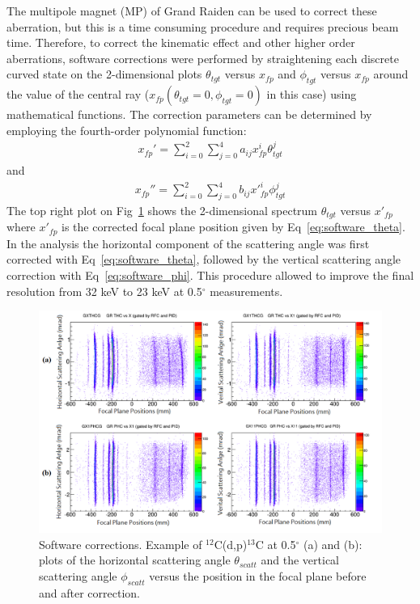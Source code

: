 The multipole magnet (MP) of Grand Raiden can be used to correct these aberration, but this  is a time consuming procedure and requires precious beam time. Therefore, to correct the kinematic effect and other higher order aberrations, software corrections were performed by straightening each discrete curved state on the 2-dimensional plots $\theta_{tgt}$ versus $x_{fp}$ and  $\phi_{tgt}$ versus $x_{fp}$ around the value of the central ray ($x_{fp}(\theta_{tgt}=0,\phi_{tgt}=0)$ in this case) using mathematical functions. The correction parameters can be determined by employing the fourth-order polynomial function:
\begin{equation}
    \label{eq:software_theta}
    \begin{aligned}
  x_{fp}'=\sum_{i=0}^2 \sum_{j=0}^4 a_{ij} x^i_{fp} \theta^j_{tgt}
    \end{aligned}
\end{equation}
and
\begin{equation}
    \label{eq:software_phi}
    \begin{aligned}
  x_{fp}''=\sum_{i=0}^2 \sum_{j=0}^4 b_{ij} x'^i_{fp} \phi^j_{tgt}
    \end{aligned}
\end{equation}
The top right plot on Fig~\ref{fig:software} shows the 2-dimensional spectrum $\theta_{tgt}$ versus $x'_{fp}$ where $x'_{fp}$ is the corrected focal plane position given by Eq~\ref{eq:software_theta}. In the analysis the horizontal component of the scattering angle was first corrected with Eq~\ref{eq:software_theta}, followed by the vertical scattering angle correction with Eq~\ref{eq:software_phi}. This procedure allowed to improve the final resolution  from 32 keV to 23 keV at 0.5$^{\circ}$ measurements.
\begin{figure}[tpb]
  \begin{center}
    \centerline{\includegraphics[scale=0.6]{graph/ch4/software}}
    \caption{Software corrections. Example of $^{12}$C(d,p)$^{13}$C at 0.5$^{\circ}$ (a) and (b): plots of the horizontal scattering angle $\theta_{scatt}$ and the vertical scattering angle $\phi_{scatt}$ versus the position in the focal plane before and after correction.}
    \label{fig:software}
  \end{center}
\end{figure}



%
% 
% 
